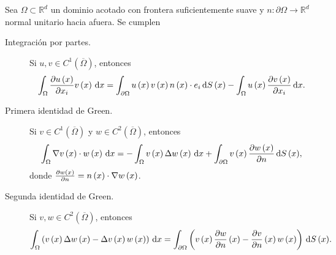 \begin{theorem}
	Sea
	\begin{math}
		\Omega\subset
		\mathbb{R}^{d}
	\end{math}
	un dominio acotado con frontera suficientemente suave
	y
	\begin{math}
		n\colon
		\partial\Omega\to
		\mathbb{R}^{d}
	\end{math}
	normal unitario hacia afuera.
	Se cumplen
	\begin{description}
		\item[Integración por partes.]

		      Si $u,v\in C^{1}\left(\overline{\Omega}\right)$, entonces
		      \begin{equation*}
			      \int_{\Omega}\diffp{u\left(x\right)}{x_{i}}
			      v\left(x\right)\dl x=
			      \int_{\partial\Omega}
			      u\left(x\right)
			      v\left(x\right)
			      n\left(x\right)\cdot
			      e_{i}
			      \dl{S\left(x\right)}-
			      \int_{\Omega}u\left(x\right)
			      \diffp{v\left(x\right)}{x_{i}}
			      \dl x.
		      \end{equation*}

		\item[Primera identidad de Green.]
		      Si $v\in C^{1}\left(\overline{\Omega}\right)$ y
		      $w\in C^{2}\left(\overline{\Omega}\right)$, entonces
		      \begin{equation*}
			      \int_{\Omega}\nabla v\left(x\right)\cdot
			      w\left(x\right)\dl x=
			      -\int_{\Omega}
			      v\left(x\right)
			      \Delta w\left(x\right)
			      \dl x+
			      \int_{\partial\Omega}
			      v\left(x\right)
			      \diffp{w\left(x\right)}{n}
			      \dl{S\left(x\right)},
		      \end{equation*}
		      donde
		      \begin{math}
			      \diffp{w\left(x\right)}{n}=
			      n\left(x\right)\cdot
			      \nabla w\left(x\right)
		      \end{math}.

		\item[Segunda identidad de Green.]

		      Si $v,w\in C^{2}\left(\overline{\Omega}\right)$, entonces
		      \begin{equation*}
			      \int_{\Omega}
			      \left(
			      v\left(x\right)
			      \Delta w\left(x\right)-
			      \Delta v\left(x\right)
			      w\left(x\right)
			      \right)
			      \dl x=
			      \int_{\partial\Omega}
			      \left(
			      v\left(x\right)
			      \diffp{w}{n}\left(x\right)-
			      \diffp{v}{n}\left(x\right)
			      w\left(x\right)
			      \right)
			      \dl{S\left(x\right)}.
		      \end{equation*}


\end{description}
\end{theorem}
